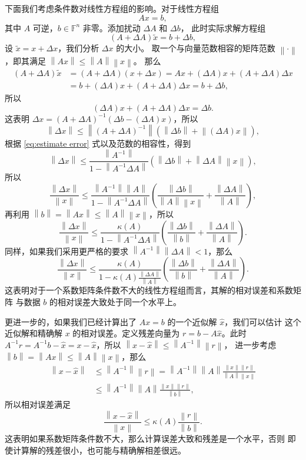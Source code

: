 \documentclass[fontset=none,zihao=-4]{Notes}
\newcommand{\norm}[1]{\left\lVert#1\right\rVert}
\begin{document}
下面我们考虑条件数对线性方程组的影响。对于线性方程组
\[
  Ax=b,  
\]
其中 $A$ 可逆，$b\in\mathbb{F}^n$ 非零。添加扰动 $\Delta A$ 和 $\Delta b$，
此时实际求解方程组
\[
  (A+\Delta A)\tilde{x}=b+\Delta b,  
\]
设 $\tilde{x}=x+\Delta x$，我们分析 $\Delta x$ 的大小。
取一个与向量范数相容的矩阵范数 $\norm{\cdot}$，即其满足 $\norm{Ax}\leq\norm{A}\norm{x}$。
那么
\begin{align*}
  (A+\Delta A)\tilde{x}&=(A+\Delta A)(x+\Delta x)=Ax+(\Delta A)x+(A+\Delta A)\Delta x\\
&=  b+(\Delta A)x+(A+\Delta A)\Delta x=b+\Delta b,
\end{align*}
所以 
\[
  (\Delta A)x+(A+\Delta A)\Delta x=\Delta b.  
\]
这表明 $\Delta x=(A+\Delta A)^{-1}(\Delta b-(\Delta A)x)$，所以
\[
  \norm{\Delta x}\leq\norm{(A+\Delta A)^{-1}}\left(\norm{\Delta b}+\norm{(\Delta A )x}\right),
\]
根据 \eqref{eq:estimate error} 式以及范数的相容性，得到
\[
  \norm{\Delta x}\leq\frac{\norm{A^{-1}}}{1-\norm{A^{-1}\Delta A}}  \left(\norm{\Delta b}+\norm{\Delta A}\norm{x}\right),
\]
所以
\[
  \frac{\norm{\Delta x}}{\norm{x}}\leq\frac{\norm{A^{-1}}\norm{A}}{1-\norm{A^{-1}\Delta A}}
  \left(\frac{\norm{\Delta b }}{\norm{A}\norm{x}}+\frac{\norm{\Delta A}}{\norm{A}}\right)  ,
\]
再利用 $\norm{b}=\norm{Ax}\leq\norm{A}\norm{x}$，所以
\begin{equation}
  \frac{\norm{\Delta x}}{\norm{x}}\leq\frac{\kappa(A)}{1-\norm{A^{-1}\Delta A}}\left(
    \frac{\norm{\Delta b}}{\norm{b}}+\frac{\norm{\Delta A}}{\norm{A}}
  \right).
\end{equation}
同样，如果我们采用更严格的要求 $\norm{A^{-1}}\norm{\Delta A}<1$，那么
\begin{equation}
  \frac{\norm{\Delta x}}{\norm{x}}\leq\frac{\kappa(A)}{1-\kappa(A)\frac{\norm{\Delta A}}{\norm A}}\left(
    \frac{\norm{\Delta b}}{\norm{b}}+\frac{\norm{\Delta A}}{\norm{A}}
  \right).
\end{equation}
这表明对于一个系数矩阵条件数不大的线性方程组而言，其解的相对误差和系数矩阵
与数据 $b$ 的相对误差大致处于同一个水平上。

更进一步的，如果我们已经计算出了 $Ax=b$ 的一个近似解 $\hat x$，我们可以估计
这个近似解和精确解 $x$ 的相对误差。定义残差向量为 $r=b-A\hat x$。此时
$A^{-1}r=A^{-1}b-\hat x=x-\hat x$，所以 $\norm{x-\hat x}\leq\norm{A^{-1}}\norm r$，
进一步考虑 $\norm b=\norm{Ax}\leq\norm{A}\norm{x}$，那么
\begin{align*}
  \norm{x-\hat x}&\leq\norm{A^{-1}}\norm{r}=\norm{A^{-1}}\norm{A}\frac{\norm{x}\norm{r}}{\norm{A}\norm{x}}\\
  &\leq \norm{A^{-1}}\norm{A}\frac{\norm{x}\norm{r}}{\norm{b}},
\end{align*}
所以相对误差满足
\begin{equation}
  \frac{\norm{x-\hat x}}{\norm x}\leq\kappa(A)\frac{\norm r}{\norm b}.
\end{equation}
这表明如果系数矩阵条件数不大，那么计算误差大致和残差是一个水平，否则
即使计算解的残差很小，也可能与精确解相差很远。
\end{document}

